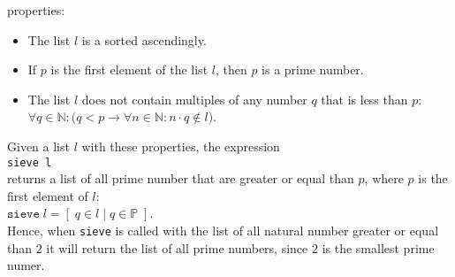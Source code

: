 \begin{enumerate}[(a)]
  properties:
  \begin{itemize}
  \item The list $l$ is a sorted ascendingly.
  \item If $p$ is the first element of the list $l$, then $p$ is a prime number.
  \item The list $l$ does not contain multiples of any number $q$ that is less than $p$:
    \\[0.2cm]
    \hspace*{1.3cm}
    $\forall q \in \mathbb{N}: \bigl(q < p \rightarrow \forall n \in \mathbb{N}: n \cdot q \not\in l\bigr)$.
  \end{itemize}
  Given a list $l$ with these properties, the expression
  \\[0.2cm]
  \hspace*{1.3cm}
  \texttt{sieve l}
  \\[0.2cm]
  returns a list of all prime number that are greater or equal than $p$, where $p$ is the first element of $l$: 
  \\[0.2cm]
  \hspace*{1.3cm}
  $\mathtt{sieve}\;l = [\; q \in l \mid q \in \mathbb{P}\;]$.
  \\[0.2cm]
  Hence, when \texttt{sieve} is called with the list of all natural number greater or equal than $2$
  it will return the list of all prime numbers, since $2$ is the smallest  prime numer.


\end{enumerate}
